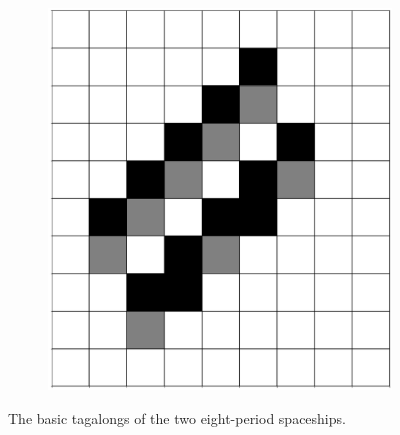 \documentclass[12pt]{article}
\numberwithin{figure}{section} %
\begin{document}
\begin{figure}[H]
   	\hspace{2cm}
     	\begin{subfigure}{0.2\textwidth}
     		\centering
     		\includegraphics[angle=270,width=\linewidth]{Section4/24.1}
     		\subcaption{}
	\end{subfigure}
	\caption[Tagalongs of eight-period spaceships]{The basic tagalongs of the two eight-period spaceships.}
	\label{fig:tagalongs of eight-period spaceships}
\end{figure}
\end{document}
